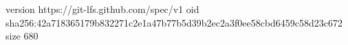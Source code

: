 version https://git-lfs.github.com/spec/v1
oid sha256:42a718365179b832271c2e1a47b77b5d39b2ec2a3f0ee58cbd6459c58d23c672
size 680
